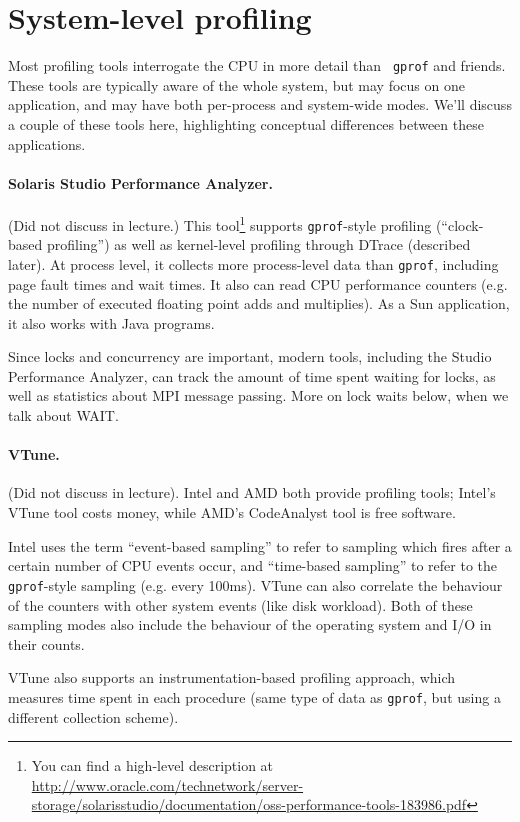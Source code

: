       \section*{System-level profiling}
Most profiling tools interrogate the CPU in more detail than {\tt
  gprof} and friends. These tools are typically aware of the whole
system, but may focus on one application, and may have both
per-process and system-wide modes. We'll discuss a couple of these
tools here, highlighting conceptual differences between these
applications.

\paragraph{Solaris Studio Performance Analyzer.} (Did not discuss in lecture.) This 
tool\footnote{You can find a high-level description at
  \url{http://www.oracle.com/technetwork/server-storage/solarisstudio/documentation/oss-performance-tools-183986.pdf}}
supports {\tt gprof}-style profiling (``clock-based profiling'') as
well as kernel-level profiling through DTrace (described later). At
process level, it collects more process-level data than {\tt gprof},
including page fault times and wait times. It also can read CPU
performance counters (e.g. the number of executed floating point adds
and multiplies).  As a Sun application, it also works with Java
programs.

Since locks and concurrency are important, modern tools, including the
Studio Performance Analyzer, can track the amount of time spent
waiting for locks, as well as statistics about MPI message
passing. More on lock waits below, when we talk about WAIT.

\paragraph{VTune.} (Did not discuss in lecture). Intel and AMD both provide profiling
tools; Intel's VTune tool costs money, while AMD's CodeAnalyst tool is
free software.

Intel uses the term ``event-based sampling'' to refer to sampling 
which fires after a certain number of CPU events occur, and ``time-based
sampling'' to refer to the {\tt gprof}-style sampling (e.g. every 100ms).
VTune can also correlate the behaviour of the counters with other
system events (like disk workload). Both of these sampling modes
also include the behaviour of the operating system and I/O in their
counts.

VTune also supports an instrumentation-based profiling approach,
which measures time spent in each procedure (same type of
data as {\tt gprof}, but using a different collection scheme).


